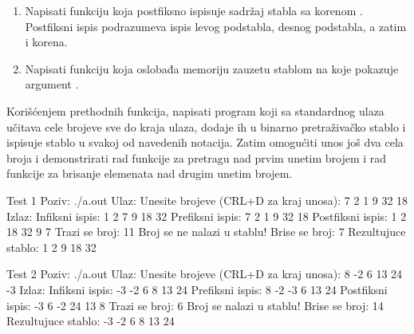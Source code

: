 \begin{Exercise}[label=701]
\begin{enumerate}
\item Napisati funkciju  koja postfiksno ispisuje sadržaj stabla sa korenom . Postfiksni ispis podrazumeva ispis levog podstabla, desnog podstabla, a zatim i korena.

\item Napisati funkciju  koja oslobađa memoriju zauzetu stablom na koje pokazuje argument .
\end{enumerate}

Korišćenjem prethodnih funkcija, napisati program koji sa standardnog ulaza učitava cele brojeve sve do kraja ulaza, dodaje ih u binarno pretraživačko stablo i ispisuje stablo u svakoj od navedenih notacija. Zatim omogućiti unos još dva cela broja i demonstrirati rad funkcije za pretragu nad prvim unetim brojem i rad funkcije za brisanje elemenata nad drugim unetim brojem. 

\begin{maxitest}
\begin{test}{Test 1}
Poziv: ./a.out
Ulaz:
	Unesite brojeve (CRL+D za kraj unosa): 7 2 1 9 32 18
Izlaz:
	Infiksni ispis: 1 2 7 9 18 32
	Prefiksni ispis: 7 2 1 9 32 18
	Postfiksni ispis: 1 2 18 32 9 7
	Trazi se broj: 11
	Broj se ne nalazi u stablu!
	Brise se broj: 7
	Rezultujuce stablo: 1 2 9 18 32
\end{test}
\end{maxitest}

\begin{maxitest}
\begin{test}{Test 2}
Poziv: ./a.out
Ulaz:
	Unesite brojeve (CRL+D za kraj unosa): 8 -2 6 13 24 -3
Izlaz:
	Infiksni ispis:  -3 -2 6 8 13 24
	Prefiksni ispis: 8 -2 -3 6 13 24
	Postfiksni ispis: -3 6 -2 24 13 8 
	Trazi se broj: 6
	Broj se nalazi u stablu!
	Brise se broj: 14
	Rezultujuce stablo: -3 -2 6 8 13 24
\end{test}
\end{maxitest}

\end{Exercise}

\begin{Answer}[ref=701]
\end{Answer}


